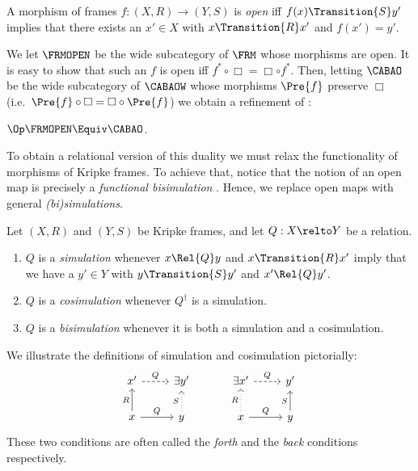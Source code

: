 \begin{definition}
  A morphism of frames \(f : (X, R) \to (Y, S)\) is \emph{open} iff
  $f(x) \Transition{S} y'$ implies that there exists an $x' \in X$ with
  $x \Transition{R} x'$ and $f(x') = y'$.
\end{definition}

We let $\FRMOPEN$ be the wide subcategory of $\FRM$ whose morphisms
are open.  It is easy to show that such an $f$ is open iff
\(f^* \circ \Box = \Box \circ f^*\). Then, letting $\CABAO$ be the
wide subcategory of $\CABAOW$ whose morphisms $\Pre{f}$ preserve
$\Box$ (i.e.\ $\Pre{f} \circ \Box = \Box \circ \Pre{f}$) we obtain a
refinement of :

\begin{theorem}
  \label{theorem:open-thomason}
  $\Op\FRMOPEN \Equiv \CABAO$.
\end{theorem}

To obtain a relational version of this duality we must relax the functionality
of morphisms of Kripke frames. To achieve that, notice that the notion of an
open map is precisely a \emph{functional bisimulation} \cite[\S
3.2]{sangiorgi_2009}. Hence, we replace open maps with general
\emph{(bi)simulations}.

\begin{definition}
  Let $(X, R)$ and $(Y, S)$ be Kripke frames, and let $Q : X \relto Y$ be a
  relation.
  \begin{enumerate}
    \item $Q$ is a \emph{simulation} whenever \(x \Rel{Q} y\) and \(x
      \Transition{R} x'\) imply that we have a \(y' \in Y\) with \(y
      \Transition{S} y'\) and \(x' \Rel{Q} y'\).
    \item $Q$ is a \emph{cosimulation} whenever $Q^\dagger$ is a simulation.
    \item $Q$ is a \emph{bisimulation} whenever it is both a simulation and a
          cosimulation.
  \end{enumerate}
\end{definition}

We illustrate the definitions of simulation and cosimulation pictorially:
\[
  \begin{tikzcd}
    x' \ar[r,dashed,"Q"] & {\exists y'} \\
    x \ar[u,"R"] \ar[r,"Q"] & y \ar[u,dotted,"S"]
  \end{tikzcd}
  \quad\quad\quad
  \begin{tikzcd}
    {\exists x'} \ar[r,dashed,"Q"] & y' \\
    x \ar[u,dotted,"R"] \ar[r,"Q"] & y \ar[u,"S"]
  \end{tikzcd}
\]
These two conditions are often called the \emph{forth} and the \emph{back}
conditions respectively.

